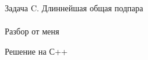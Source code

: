 {\large Задача C. Длиннейшая общая подпара} 
\\
\\
Разбор от меня

\newpage
{\large Решение на С++}
\\
\\

